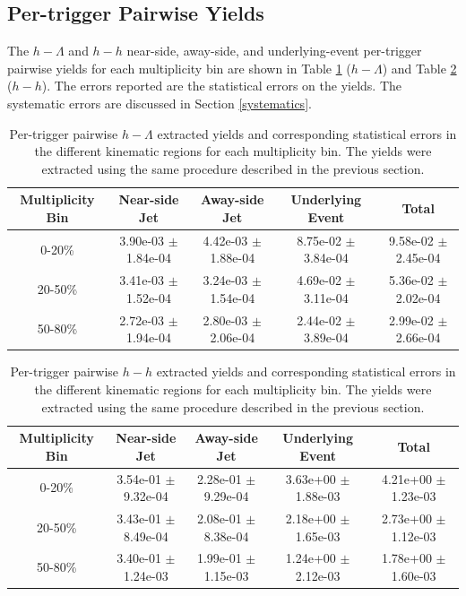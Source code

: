 \documentclass[ALICE,manyauthors]{ALICE_analysis_notes}
\begin{document}
\subsection{Per-trigger Pairwise Yields}

The $h-\Lambda$ and $h-h$ near-side, away-side, and underlying-event per-trigger pairwise yields for each multiplicity bin are shown in Table \ref{h_lambda_yield_table} ($h-\Lambda$) and Table \ref{h_h_yield_table} ($h-h$). The errors reported are the statistical errors on the yields. The systematic errors are discussed in Section \ref{systematics}.

\begin{table}[h!]
\centering
\begin{tabular}{| c | c | c | c | c | }
\hline
Multiplicity Bin & Near-side Jet & Away-side Jet & Underlying Event & Total  \\
\hline

0-20\% & 3.90e-03 $\pm$ 1.84e-04 & 4.42e-03 $\pm$ 1.88e-04 & 8.75e-02 $\pm$ 3.84e-04 & 9.58e-02 $\pm$ 2.45e-04 \\
20-50\% & 3.41e-03 $\pm$ 1.52e-04 & 3.24e-03 $\pm$ 1.54e-04 & 4.69e-02 $\pm$ 3.11e-04 & 5.36e-02 $\pm$ 2.02e-04 \\
50-80\% & 2.72e-03 $\pm$ 1.94e-04 & 2.80e-03 $\pm$ 2.06e-04 & 2.44e-02 $\pm$ 3.89e-04 & 2.99e-02 $\pm$ 2.66e-04 \\

\hline
\end{tabular}
\caption{Per-trigger pairwise $h-\Lambda$ extracted yields and corresponding statistical errors in the different kinematic regions for each multiplicity bin. The yields were extracted using the same procedure described in the previous section.}
\label{h_lambda_yield_table}
\end{table}

\begin{table}[h!]
\centering
\begin{tabular}{| c | c | c | c | c | }
\hline
Multiplicity Bin & Near-side Jet & Away-side Jet & Underlying Event & Total  \\
\hline

0-20\% & 3.54e-01 $\pm$ 9.32e-04 & 2.28e-01 $\pm$ 9.29e-04 & 3.63e+00 $\pm$ 1.88e-03 & 4.21e+00 $\pm$ 1.23e-03 \\
20-50\% & 3.43e-01 $\pm$ 8.49e-04 & 2.08e-01 $\pm$ 8.38e-04 & 2.18e+00 $\pm$ 1.65e-03 & 2.73e+00 $\pm$ 1.12e-03 \\
50-80\% & 3.40e-01 $\pm$ 1.24e-03 & 1.99e-01 $\pm$ 1.15e-03 & 1.24e+00 $\pm$ 2.12e-03 & 1.78e+00 $\pm$ 1.60e-03 \\

\hline
\end{tabular}
\caption{Per-trigger pairwise $h-h$ extracted yields and corresponding statistical errors in the different kinematic regions for each multiplicity bin. The yields were extracted using the same procedure described in the previous section.}
\label{h_h_yield_table}
\end{table}
\end{document}
